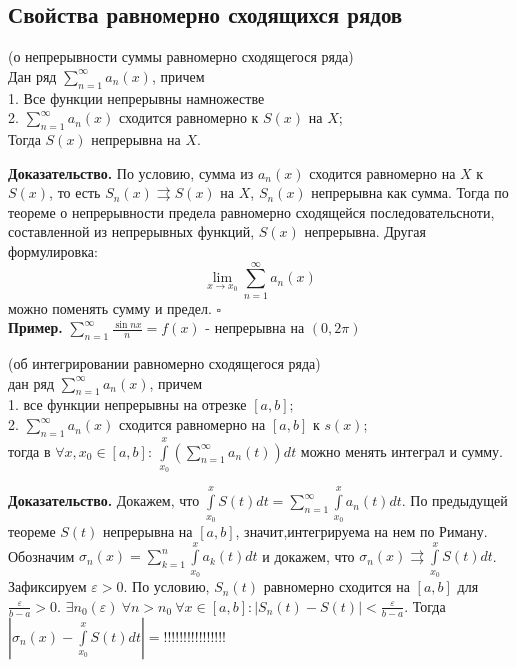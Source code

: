 \subsection{Свойства равномерно сходящихся рядов}
\begin{theor}
    (о непрерывности суммы равномерно сходящегося ряда)\\
    Дан ряд $\sum\limits_{n=1}^{\infty} a_n(x)$, причем \\
    1. Все функции непрерывны намножестве\\
2. $\sum\limits_{n=1}^{\infty} a_n(x)$ сходится равномерно к $S(x)$ на $X$;\\
Тогда $S(x)$ непрерывна на $X$. 
\end{theor}
\textbf{Доказательство.}  По условию, сумма из  $a_n(x)$ сходится равномерно
на  $X$ к  $S(x)$, то есть  $S_n(x)\rightrightarrows S(x)$ на  $X$, 
$S_n(x)$ непрерывна как сумма. Тогда по теореме о непрерывности предела
равномерно сходящейся последовательсноти, составленной из непрерывных
функций,  $S(x)$  непрерывна. Другая формулировка: 
$$\lim\limits_{x\to x_0}\sum\limits_{n=1}^{\infty} a_n(x)$$ 
можно поменять сумму и предел. $\square$\\
\textbf{Пример.} $\sum\limits_{n=1}^{\infty} \frac{\sin{nx}}{n}=f(x)$ - 
непрерывна на $(0,2\pi)$
\begin{theor}
(об интегрировании равномерно сходящегося ряда)\\
 дан ряд $\sum\limits_{n=1}^{\infty} a_n(x)$, причем \\
 1. все функции непрерывны на отрезке $[a,b];$\\
 2. $\sum\limits_{n=1}^{\infty} a_n(x)$ сходится равномерно на $[a,b]$ к $s
 (x)$;\\
 тогда в $\forall x,x_0\in[a,b]:~\int\limits^x_{x_0}\left( \sum\limits_{n=1}^
 {\infty} a_n(t) \right)dt$ можно менять интеграл и сумму.
\end{theor}
\textbf{Доказательство.} Докажем, что $\int\limits^x_{x_0}S(t)dt=\sum\limits_{n=1}^{\infty} \int\limits^x_{x_0}a_n(t)dt$. По предыдущей теореме $S(t)$ 
непрерывна на  $[a,b]$, значит,интегрируема на нем по Риману. 
Обозначим  $\sigma_n(x)=\sum\limits_{k=1}^{n}\int\limits^x_{x_0}a_k(t)dt$ и
докажем, что $\sigma_n(x)\rightrightarrows\int\limits^x_{x_0}S(t)dt$.\\
Зафиксируем $\varepsilon>0$. По условию, $S_n(t)$ равномерно сходится на 
$[a,b]$ для  $\frac{\varepsilon}{b-a}>0$. $\exists n_0(\varepsilon)~\forall 
n>n_0~\forall x\in[a,b]:|S_n(t)-S(t)|< \frac{\varepsilon}{b-a}$. Тогда
$|\sigma_n(x)-\int\limits^x_{x_0}S(t)dt|=!!!!!!!!!!!!!!!!$
